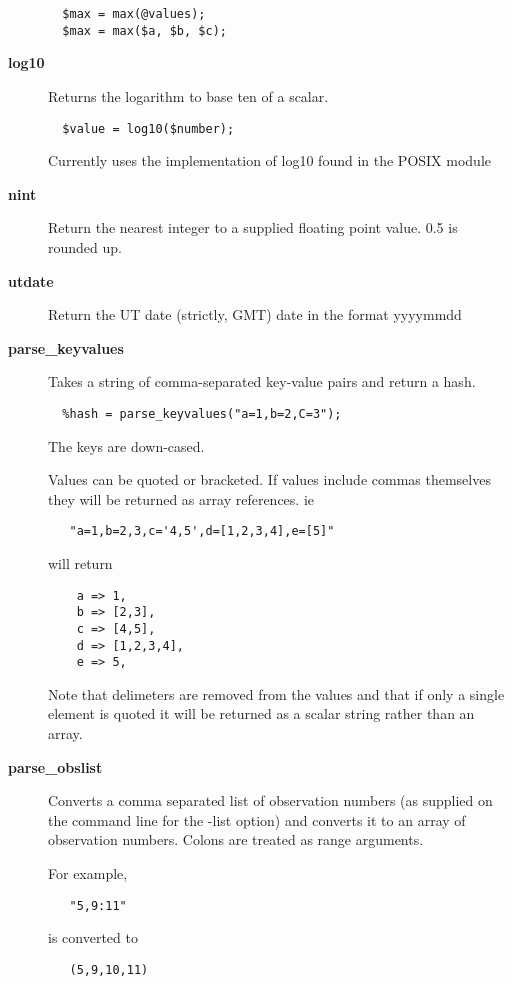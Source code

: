 \begin{description}
\begin{verbatim}
  $max = max(@values);
  $max = max($a, $b, $c);
\end{verbatim}

\item[\textbf{log10}] \mbox{}

Returns the logarithm to base ten of a scalar.

\begin{verbatim}
  $value = log10($number);
\end{verbatim}


Currently uses the implementation of log10 found in the
POSIX module


\item[\textbf{nint}] \mbox{}

Return the nearest integer to a supplied floating point
value. 0.5 is rounded up.


\item[\textbf{utdate}] \mbox{}

Return the UT date (strictly, GMT) date in the format yyyymmdd


\item[\textbf{parse\_keyvalues}] \mbox{}

Takes a string of comma-separated key-value pairs and return a hash.

\begin{verbatim}
  %hash = parse_keyvalues("a=1,b=2,C=3");
\end{verbatim}


The keys are down-cased.



Values can be quoted or bracketed. If values include commas themselves
they will be returned as array references. ie

\begin{verbatim}
   "a=1,b=2,3,c='4,5',d=[1,2,3,4],e=[5]"
\end{verbatim}


will return

\begin{verbatim}
    a => 1,
    b => [2,3],
    c => [4,5],
    d => [1,2,3,4],
    e => 5,
\end{verbatim}


Note that delimeters are removed from the values and that if only a
single element is quoted it will be returned as a scalar string rather
than an array.


\item[\textbf{parse\_obslist}] \mbox{}

Converts a comma separated list of observation numbers (as supplied
on the command line for the -list option) and converts it to
an array of observation numbers. Colons are treated as range arguments.



For example,

\begin{verbatim}
   "5,9:11"
\end{verbatim}


is converted to

\begin{verbatim}
   (5,9,10,11)
\end{verbatim}
\end{description}
